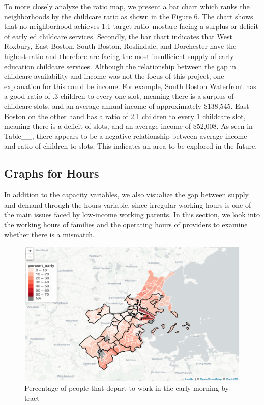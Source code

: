 \documentclass[10pt,letterpaper]{article}
\begin{document}
To more closely analyze the ratio map, we present a bar chart which
ranks the neighborhoods by the childcare ratio as shown in the Figure 6.
The chart shows that no neighborhood achieves 1:1 target ratio--mostare
facing a surplus or deficit of early ed childcare services. Secondly,
the bar chart indicates that West Roxbury, East Boston, South Boston,
Roslindale, and Dorchester have the highest ratio and therefore are
facing the most insufficient supply of early education childcare
services. Although the relationship between the gap in childcare
availability and income was not the focus of this project, one
explanation for this could be income. For example, South Boston
Waterfront has a good ratio of .3 children to every one slot, meaning
there is a surplus of childcare slots, and an average annual income of
approximately \$138,545. East Boston on the other hand has a ratio of
2.1 children to every 1 childcare slot, meaning there is a deficit of
slots, and an average income of \$52,008. As seen in Table\_\_, there
appears to be a negative relationship between average income and ratio
of children to slots. This indicates an area to be explored in the
future.

\subsection{Graphs for Hours}\label{graphs-for-hours}

In addition to the capacity variables, we also visualize the gap between
supply and demand through the hours variable, since irregular working
hours is one of the main issues faced by low-income working parents. In
this section, we look into the working hours of families and the
operating hours of providers to examine whether there is a mismatch.

\begin{figure}

{\centering \includegraphics[width=1\linewidth]{fig4} 

}

\caption{Percentage of people that depart to work in the early morning by tract}\label{fig:unnamed-chunk-7}
\end{figure}
\end{document}
